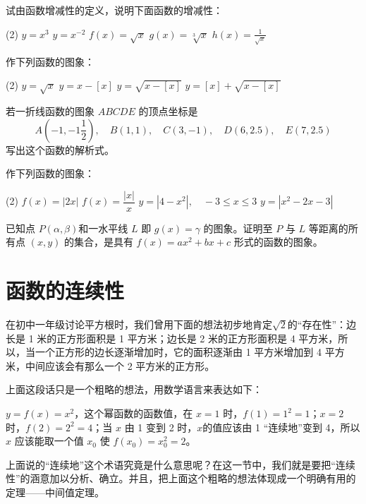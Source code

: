 \begin{ex}
\begin{question}
  \item 试由函数增减性的定义，说明下面函数的增减性：
  \begin{tasks}(2)
    \task $y=x^3$
    \task $y=x^{-2}$
    \task $f(x)=\sqrt{x}$
    \task $g(x)=\sqrt[3]{x}$
    \task $h(x)=\frac{1}{\sqrt{x}}$
  \end{tasks}        
  \item 作下列函数的图象：
  \begin{tasks}(2)   
    \task $y=\sqrt{x}$
    \task $y=x-[x]$
    \task $y=\sqrt{x-[x]}$
    \task $y=[x]+\sqrt{x-[x]}$
  \end{tasks}        
  \item 若一折线函数的图象 $ABCDE$ 的顶点坐标是
  \[A\left(-1,-1\frac{1}{2}\right),\quad B(1,1),\quad C(3,-1),\quad D(6,2.5),\quad E(7,2.5)\]    
写出这个函数的解析式。

\item 作下列函数的图象：
\begin{tasks}(2)  
  \task $f(x)=|2x|$
  \task $f(x)=\dfrac{|x|}{x}$
  \task $y=|4-x^2|,\quad -3\leqslant x\leqslant 3$
  \task $y=|x^2-2x-3|$
\end{tasks}        
\item 已知点 $P(\alpha,\beta)$和一水平线 $L$ 即 $g(x)=\gamma$ 的图象。证明至 $P$ 与 $L$ 等距离的所有点 $(x,y)$ 的集合，是具有 $f(x)=ax^2+bx+c$ 形式的函数的图象。
\end{question}
\end{ex}

\section{函数的连续性}
在初中一年级讨论平方根时，我们曾用下面的想法初步地肯定$\sqrt{2}$的“存在性”：边长是 1 米的正方形面积是 1 平方米；边长是 2 米的正方形面积是 4 平方米，所以，当一个正方形的边长逐渐增加时，它的面积逐渐由 1 平方米增加到 4 平方米，中间应该会有那么一个 2 平方米的正方形。

上面这段话只是一个粗略的想法，用数学语言来表达如下：

$y=f(x)=x^2$，这个幂函数的函数值，在 $x=1$ 时，$f(1)=1^2=1$；$x=2$ 时，$f(2)=2^2=4$；当 $x$ 由 1 变到 2 时，$x$的值应该由 1 “连续地”变到 4，所以 $x$ 应该能取一个值 $x_0$ 使 $f(x_0)=x^2_0=2$。

上面说的“连续地”这个术语究竟是什么意思呢？在这一节中，我们就是要把“连续性”的涵意加以分析、确立。并且，把上面这个粗略的想法体现成一个明确有用的定理——中间值定理。

